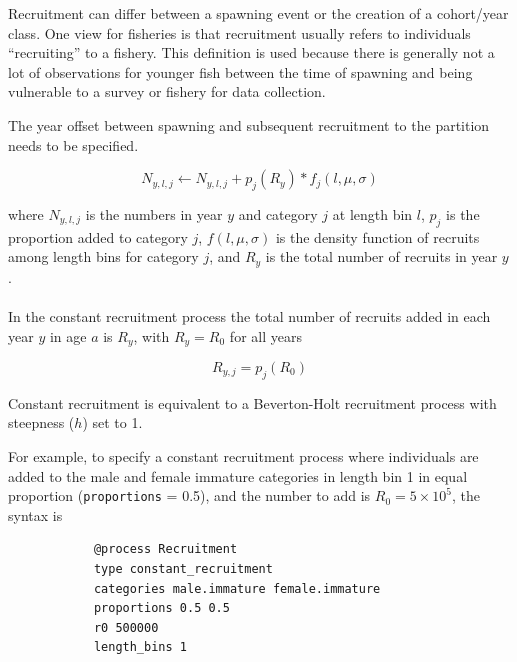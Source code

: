 Recruitment can differ between a spawning event or the creation of a cohort/year class. One view for fisheries is that recruitment usually refers to individuals \enquote{recruiting} to a fishery. This definition is used because there is generally not a lot of observations for younger fish between the time of spawning and being vulnerable to a survey or fishery for data collection.

The year offset  between spawning and subsequent recruitment to the partition needs to be specified. 

\begin{equation}
N_{y,l,j} \leftarrow N_{y,l,j} + p_j(R_y) * f_j(l,\mu, \sigma)
\end{equation}

where $N_{y,l,j}$ is the numbers in year $y$ and category $j$ at length bin $l$, $p_j$ is the proportion added to category $j$, \(f(l,\mu, \sigma)\) is the density function of recruits among length bins for category \(j\), and $R_y$ is the total number of recruits in year $y$.


\paragraph{}\label{sec:Process-RecruitmentConstant}

In the constant recruitment process the total number of recruits added in each year $y$ in age $a$ is $R_y$, with $R_y = R_0$ for all years

\begin{equation}
	R_{y,j} = p_j(R_0)
\end{equation}

Constant recruitment is equivalent to a Beverton-Holt recruitment process with steepness ($h$) set to 1.

For example, to specify a constant recruitment process where individuals are added to the male and female immature categories in length bin 1 in equal proportion (\texttt{proportions} = 0.5), and the number to add is $R_0=5 \times 10^5$, the syntax is

{\small{\begin{verbatim}
			@process Recruitment
			type constant_recruitment
			categories male.immature female.immature
			proportions 0.5 0.5
			r0 500000
			length_bins 1
\end{verbatim}}}

\paragraph{}\label{sec:Process-RecruitmentBevertonHolt}

